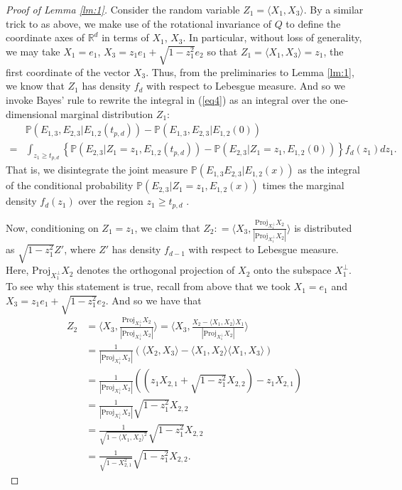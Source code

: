 \documentclass{article}
\begin{document}
\begin{proof}[Proof of Lemma \ref{lm:1}]
Consider the random variable $Z_1 = \langle X_1, X_3 \rangle$. By a similar trick to as above, we make use of the rotational invariance of $Q$ to define the coordinate axes of $\mathbb{R}^d$ in terms of $X_1$, $X_3$. In particular, without loss of generality, we may take $X_1 = e_1$, $X_3 = z_1e_1 + \sqrt{1 - z_1^2}e_2$ so that $Z_1 = \langle X_1, X_3 \rangle = z_1$, the first coordinate of the vector $X_3$. Thus, from the preliminaries to Lemma \ref{lm:1}, we know that $Z_1$ has density $f_d$ with respect to Lebesgue measure. And so we invoke Bayes' rule to rewrite the integral in (\ref{eq4}) as an integral over the one-dimensional marginal distribution $Z_1$:
\begin{align}
    &\mathbb{P}(E_{1,3}, E_{2,3} | E_{1,2}(t_{p,d}))  - \mathbb{P}(E_{1, 3}, E_{2,3}| E_{1,2}(0)) \nonumber \\
    =& \int_{z_1 \geq t_{p, d}} \left\{ \mathbb{P} (E_{2,3} | Z_1 = z_1, E_{1,2}(t_{p,d}))  -  \mathbb{P} (E_{2,3} | Z_1 = z_1, E_{1,2}(0)) \right\} f_d(z_1) d z_1.\label{eq5}
\end{align}
That is, we disintegrate the joint measure $\mathbb{P}(E_{1,3} E_{2,3} | E_{1,2}(x))$ as the integral of the conditional probability $\mathbb{P}(E_{2,3} | Z_1 = z_1, E_{1,2}(x))$ times the marginal density $f_d(z_1)$ over the region $z_1 \geq t_{p,d}$ \cite{pollard_2001}.

Now, conditioning on $Z_1 = z_1$, we claim that $Z_2 : = \bigg\langle X_3, \frac{\text{Proj}_{X_1^{\perp}}X_2}{\left| \text{Proj}_{X_1^{\perp}}X_2 \right|} \bigg\rangle$ is distributed as $\sqrt{1-z_1^2}Z'$, where $Z'$ has density $f_{d-1}$ with respect to Lebesgue measure. Here, $\text{Proj}_{X_1^{\perp}}X_2$ denotes the orthogonal projection of $X_2$ onto the subspace $X_1^{\perp}$. To see why this statement is true, recall from above that we took $X_1 = e_1$ and $X_3 = z_1e_1 + \sqrt{1-z_1^2}e_2$. And so we have that 
\begin{align*}
    Z_2 &= \bigg\langle X_3, \frac{\text{Proj}_{X_1^{\perp}}X_2}{\left| \text{Proj}_{X_1^{\perp}}X_2 \right|} \bigg\rangle = \bigg\langle X_3, \frac{X_2 - \langle X_1, X_2 \rangle X_1}{\left| \text{Proj}_{X_1^{\perp}}X_2 \right|} \bigg\rangle\\
    &= \frac{1}{\left| \text{Proj}_{X_1^{\perp}}X_2 \right|} \left( \langle X_2, X_3 \rangle - \langle X_1, X_2 \rangle \langle X_1, X_3 \rangle \right)\\
    &= \frac{1}{\left| \text{Proj}_{X_1^{\perp}}X_2 \right|} \left( \left( z_1X_{2,1} + \sqrt{1 - z_1^2}X_{2,2} \right) - z_1X_{2,1} \right)\\
    &= \frac{1}{\left| \text{Proj}_{X_1^{\perp}}X_2 \right|} \sqrt{1 - z_1^2}X_{2,2}\\
    &= \frac{1}{\sqrt{1 - \langle X_1, X_2 \rangle^2}} \sqrt{1 - z_1^2}X_{2,2}\\
    &= \frac{1}{\sqrt{1 - X_{2,1}^2}} \sqrt{1 - z_1^2}X_{2,2}.
\end{align*}


\end{proof}
\end{document}
